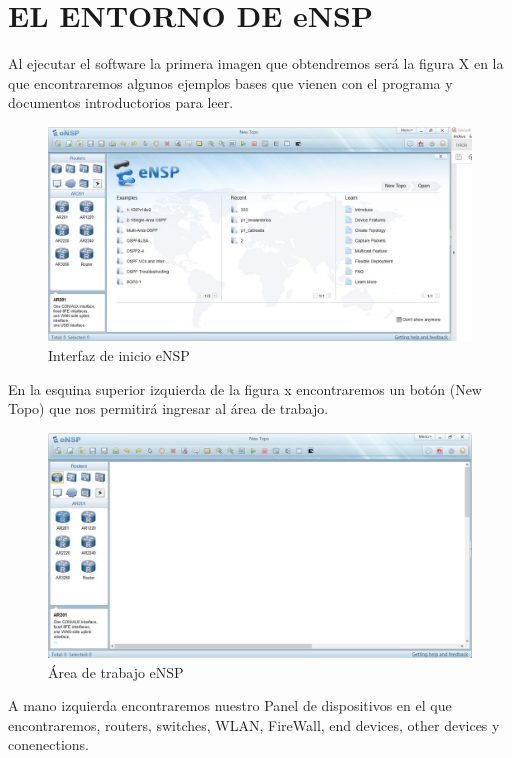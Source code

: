 \documentclass[journal]{IEEEtran}
\begin{document}
\section{EL ENTORNO DE eNSP}
Al ejecutar el software la primera imagen que obtendremos será la figura X en la que encontraremos algunos ejemplos bases que vienen con el programa y documentos introductorios para leer.
\begin{center}
\begin{figure}[H]
\centering
\includegraphics[scale=0.25]{0.JPG} 
\caption{Interfaz de inicio eNSP}
\end{figure}
\end{center}
En la esquina superior izquierda de la figura x encontraremos un botón (New Topo) que nos permitirá ingresar al área de trabajo.
\begin{center}
\begin{figure}[H]
\centering
\includegraphics[scale=0.25]{1.JPG} 
\caption{Área de trabajo eNSP}
\end{figure}
\end{center}
A mano izquierda encontraremos nuestro Panel de dispositivos en el que encontraremos, routers, switches, WLAN, FireWall, end devices, other devices y conenections.
\end{document}
